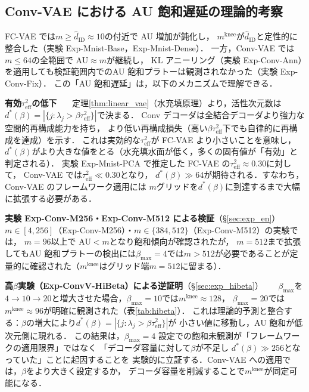 \documentclass[11pt,a4paper]{jsarticle}
\newcommand{\mknee}{m^{\mathrm{knee}}}
\begin{document}
\subsection{Conv-VAE における AU 飽和遅延の理論的考察}\label{sec:disc_convvae}

FC-VAE では$m \geq \hat{d}_\mathrm{ID} \approx 10$の付近で AU 増加が鈍化し，
$\mknee$が$\hat{d}_\mathrm{ID}$と定性的に整合した（実験 Exp-Mnist-Base，Exp-Mnist-Dense）．
一方，Conv-VAE では$m \leq 64$の全範囲で AU$\approx m$が継続し，
KL アニーリング（実験 Exp-Conv-Ann）を適用しても検証範囲内でのAU 飽和プラトーは観測されなかった（実験 Exp-Conv-Fix）．
この「AU 飽和遅延」は，以下のメカニズムで理解できる．

\textbf{有効$\tau^2_\mathrm{eff}$の低下}~~~
定理\ref{thm:linear_vae}（水充填原理）より，活性次元数は
$d^*(\beta) = |\{j : \lambda_j > \beta\tau^2_\mathrm{eff}\}|$で決まる．
Conv デコーダは全結合デコーダより強力な空間的再構成能力を持ち，
より低い再構成損失（高い$\beta\tau^2_\mathrm{eff}$下でも自律的に再構成を達成）を示す．
これは実効的な$\tau^2_\mathrm{eff}$が FC-VAE より小さいことを意味し，
$d^*(\beta)$がより大きな値をとる（水充填水面が低く，多くの固有値が「有効」と判定される）．
実験 Exp-Mnist-PCA で推定した FC-VAE の$\tau^2_\mathrm{eff} \approx 0.30$に対して，
Conv-VAE では$\tau^2_\mathrm{eff} \ll 0.30$となり，
$d^*(\beta) \gg 64$が期待される．すなわち，Conv-VAE のフレームワーク適用には
$m$グリッドを$d^*(\beta)$に到達するまで大幅に拡張する必要がある．

\textbf{実験 Exp-Conv-M256・Exp-Conv-M512 による検証}（§\ref{sec:exp_en}）~~~
$m \in [4,256]$（Exp-Conv-M256）・$m \in \{384,512\}$（Exp-Conv-M512）の実験では，
$m = 96$以上で AU$<m$となり飽和傾向が確認されたが，
$m=512$まで拡張してもAU 飽和プラトーの検出には$\beta_{\max}=4$では$m>512$が必要であることが定量的に確認された（$\mknee$はグリッド端$m=512$に留まる）．

\textbf{高$\beta$実験（Exp-ConvV-HiBeta）による逆証明}（§\ref{sec:exp_hibeta}）~~~
$\beta_{\max}$を$4\to10\to20$と増大させた場合，$\beta_{\max}=10$では$\mknee \approx 128$，
$\beta_{\max}=20$では$\mknee \approx 96$が明確に観測された（表\ref{tab:hibeta}）．
これは理論的予測と整合する：$\beta$の増大により$d^*(\beta) = |\{j: \lambda_j > \beta\tau^2_\mathrm{eff}\}|$が
小さい値に移動し，AU 飽和が低次元側に現れる．
この結果は，$\beta_{\max}=4$ 設定での飽和未観測が「フレームワークの適用限界」ではなく
「デコーダ容量に対して$\beta$が不足し $d^*(\beta) \gg 256$となっていた」ことに起因することを
実験的に立証する．Conv-VAE への適用では，$\beta$をより大きく設定するか，
デコーダ容量を削減することで$\mknee$が同定可能になる．
\end{document}
